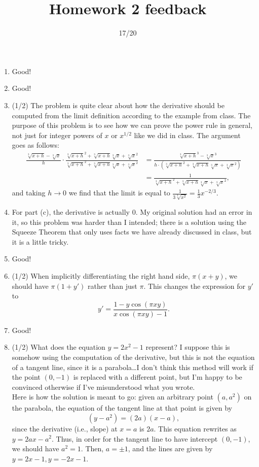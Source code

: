 \documentclass{article}
\title{Homework 2 feedback}
\author{}
\date{17/20}
\begin{document}
\maketitle
\begin{enumerate}
	\item Good!
	\item Good!	
	\item (1/2) The problem is quite clear about how the derivative should be computed from the limit definition according to the example from class. The purpose of this problem is to see how we can prove the power rule in general, not just for integer powers of $x$ or $x^{1/2}$ like we did in class. The argument goes as follows:\\
		\begin{align*}
		\frac{\sqrt[3]{x+h} - \sqrt[3]{x}}{h} \cdot \frac{\sqrt[3]{x+h}^{2} + \sqrt[3]{x+h} \sqrt[3]{x} + \sqrt[3]{x}^{2}}{\sqrt[3]{x+h}^{2} + \sqrt[3]{x+h} \sqrt[3]{x} + \sqrt[3]{x}^{2}} &= \frac{\sqrt[3]{x+h}^{3} - \sqrt[3]{x}^{3}}{h \cdot (\sqrt[3]{x+h}^{2} + \sqrt[3]{x+h} \sqrt[3]{x} + \sqrt[3]{x}^{2})}\\
		&= \frac{1}{\sqrt[3]{x+h}^{2} + \sqrt[3]{x+h} \sqrt[3]{x} + \sqrt[3]{x}^{2}},
		\end{align*}
		and taking $h \to 0$ we find that the limit is equal to $\frac{1}{3 \sqrt[3]{x^{2}}} = \frac{1}{3} x^{-2/3}$.
	\item For part (c), the derivative is actually 0. My original solution had an error in it, so this problem was harder than I intended; there is a solution using the Squeeze Theorem that only uses facts we have already discussed in class, but it is a little tricky. 
	\item Good!
	\item (1/2) When implicitly differentiating the right hand side, $\pi(x+y)$, we should have $\pi(1 + y')$ rather than just $\pi$. This changes the expression for $y'$ to 
		\[
			y' = \frac{1 - y \cos(\pi xy)}{x \cos(\pi xy) - 1}.
		\]
	\item Good!
	\item (1/2) What does the equation $y = 2x^{2} - 1$ represent? I suppose this is somehow using the computation of the derivative, but this is not the equation of a tangent line, since it is a parabola\ldots I don't think this method will work if the point $(0,-1)$ is replaced with a different point, but I'm happy to be convinced otherwise if I've misunderstood what you wrote.\\
		Here is how the solution is meant to go: given an arbitrary point $(a, a^{2})$ on the parabola, the equation of the tangent line at that point is given by 
		\[
			(y - a^{2}) = (2a) (x-a),
		\]
		since the derivative (i.e., slope) at $x=a$ is $2a$. This equation rewrites as $y = 2ax - a^{2}$. Thus, in order for the tangent line to have intercept $(0, -1)$, we should have $a^{2} = 1$. Then, $a = \pm 1$, and the lines are given by $y = 2x-1, y = -2x-1$.
\end{enumerate}
\end{document}
